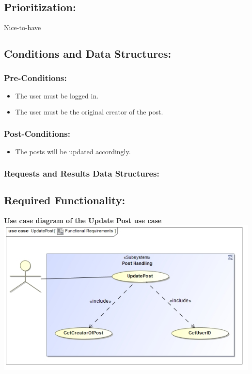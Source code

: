 \documentclass[a4paper,11pt]{article}
\begin{document}
\subsection{Prioritization:} Nice-to-have
\subsection{Conditions and Data Structures:}
\subsubsection*{Pre-Conditions:}
\begin{itemize}
	\item The user must be logged in.
	\item The user must be the original creator of the post.
\end{itemize}
\subsubsection*{Post-Conditions:}
\begin{itemize}
	\item The posts will be updated accordingly.
\end{itemize}
\subsubsection*{Requests and Results Data Structures:}
\subsection{Required Functionality:} 
\textbf{Use case diagram of the Update Post use case}\\
\includegraphics[width=1\linewidth]{./Images/PostHandling/postUpdate.jpg}\\
\end{document}
